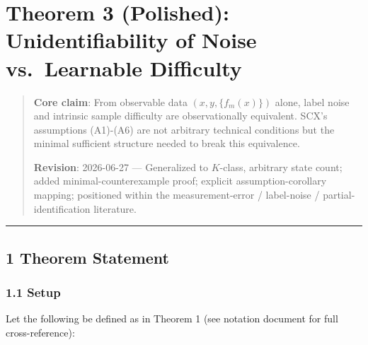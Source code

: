 \documentclass[
  12pt,
]{ctexart}
\author{SCX}
\date{2026}
\begin{document}
\section{Theorem 3 (Polished): Unidentifiability of Noise vs.~Learnable
Difficulty}\label{theorem-3-polished-unidentifiability-of-noise-vs.-learnable-difficulty}

\begin{quote}
\textbf{Core claim}: From observable data \((x, y, \{f_m(x)\})\) alone,
label noise and intrinsic sample difficulty are observationally
equivalent. SCX's assumptions (A1)-(A6) are not arbitrary technical
conditions but the minimal sufficient structure needed to break this
equivalence.

\textbf{Revision}: 2026-06-27 --- Generalized to \(K\)-class, arbitrary
state count; added minimal-counterexample proof; explicit
assumption-corollary mapping; positioned within the measurement-error /
label-noise / partial-identification literature.
\end{quote}

\begin{center}\rule{0.5\linewidth}{0.5pt}\end{center}

\subsection{1 Theorem Statement}\label{theorem-statement}

\subsubsection{1.1 Setup}\label{setup}

Let the following be defined as in Theorem 1 (see notation document for
full cross-reference):
\end{document}

